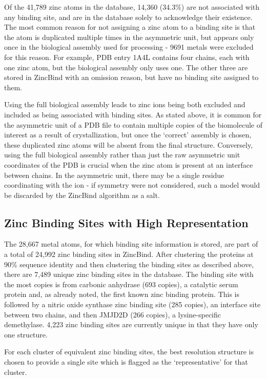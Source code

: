 Of the 41,789 zinc atoms in the database, 14,360 (34.3\%) are not associated with any binding site, and are in the database solely to acknowledge their existence. The most common reason for not assigning a zinc atom to a binding site is that the atom is duplicated multiple times in the asymmetric unit, but appears only once in the biological assembly used for processing - 9691 metals were excluded for this reason. For example, PDB entry 1A4L contains four chains, each with one zinc atom, but the biological assembly only uses one. The other three are stored in ZincBind with an omission reason, but have no binding site assigned to them.

Using the full biological assembly leads to zinc ions being both excluded and included as being associated with binding sites. As stated above, it is common for the asymmetric unit of a PDB file to contain multiple copies of the biomolecule of interest as a result of crystallization, but once the `correct' assembly is chosen, these duplicated zinc atoms will be absent from the final structure. Conversely, using the full biological assembly rather than just the raw asymmetric unit coordinates of the PDB is crucial when the zinc atom is present at an interface between chains. In the asymmetric unit, there may be a single residue coordinating with the ion - if symmetry were not considered, such a model would be discarded by the ZincBind algorithm as a salt.

\subsection{Zinc Binding Sites with High Representation}

The 28,667 metal atoms, for which binding site information is stored, are part of a total of 24,992 zinc binding sites in ZincBind. After clustering the proteins at 90\% sequence identity and then clustering the binding sites as described above, there are 7,489 unique zinc binding sites in the database. The binding site with the most copies is from carbonic anhydrase (693 copies), a catalytic serum protein and, as already noted, the first known zinc binding protein. This is followed by a nitric oxide synthase zinc binding site (285 copies), an interface site between two chains, and then JMJD2D (266 copies), a lysine-specific demethylase. 4,223 zinc binding sites are currently unique in that they have only one structure.

For each cluster of equivalent zinc binding sites, the best resolution structure is chosen to provide a single site which is flagged as the `representative' for that cluster.


